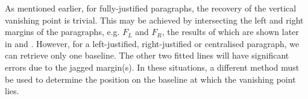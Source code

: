 As mentioned earlier, for fully-justified paragraphs, the recovery of the
vertical vanishing point is trivial. This may be achieved by intersecting the
left and right margins of the paragraphs, e.g. $F_L$ and $F_R$, the results of 
which are shown later in  and . 
However, for a left-justified, right-justified or centralised paragraph, we can
retrieve only one baseline.  The other two fitted lines will have significant
errors due to the jagged margin(s).  In these situations, a different method
must be used to determine the position on the baseline at which the vanishing
point lies.






